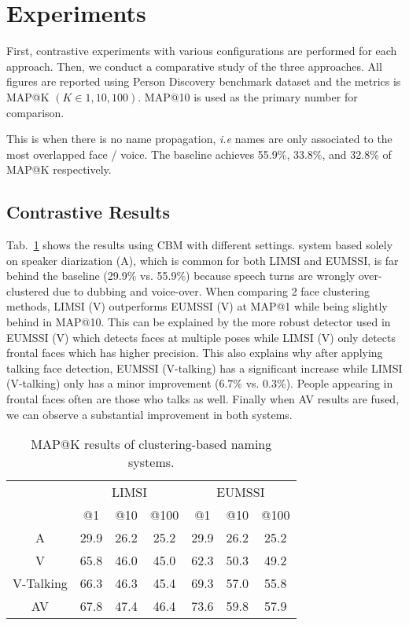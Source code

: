 \section{Experiments}
\label{sec:experiment}

First, contrastive experiments with various configurations are performed for each approach. Then, we conduct a comparative study of the three approaches. All figures are reported using Person Discovery benchmark dataset and the metrics is MAP@K $(K \in {1, 10, 100})$. MAP@10 is used as the primary number for comparison.

 This is when there is no name propagation, \emph{i.e} names are only associated to the most overlapped face / voice. The baseline achieves 55.9\%, 33.8\%, and 32.8\% of MAP@K respectively.

\subsection{Contrastive Results}

 Tab.~\ref{tab:clustering} shows the results using CBM with different settings. system based solely on speaker diarization (A), which is common for both LIMSI and EUMSSI, is far behind the baseline (29.9\% vs. 55.9\%) because speech turns are wrongly over-clustered due to dubbing and voice-over.
%
When comparing 2 face clustering methods, LIMSI (V) outperforms EUMSSI (V) at MAP@1 while being slightly behind in MAP@10. This can be explained by the more robust detector used in EUMSSI (V) which detects faces at multiple poses while LIMSI (V) only detects frontal faces which has higher precision.
%
This also explains why after applying talking face detection, EUMSSI (V-talking) has a significant increase while LIMSI (V-talking) only has a minor improvement (6.7\% vs. 0.3\%). People appearing in frontal faces often are those who talks as well.
%
Finally when AV results are fused, we can observe a substantial improvement in both systems.

\begin{table}[tb]
\centering
\caption{MAP@K results of clustering-based naming systems.}
\vspace*{-2mm}
\begin{tabular}{c|c|c|c|| c|c|c|}
\cline{2-7}
  &  \multicolumn{3}{|c||}{LIMSI} &  \multicolumn{3}{|c|}{EUMSSI} \\ \cline{2-7}
           & @1& @10& @100   & @1& @10& @100 \\ \hline
 \multicolumn{1}{|c|}{A} & 29.9   & 26.2   & 25.2  & 29.9   & 26.2   & 25.2\\ \hline
 \multicolumn{1}{|c|}{V} & 65.8   & 46.0   & 45.0 & 62.3   & 50.3   & 49.2 \\ \hline
 \multicolumn{1}{|c|}{V-Talking} & 66.3   & 46.3   & 45.4 & 69.3   & 57.0   & 55.8 \\ \hline
 \multicolumn{1}{|c|}{AV} & 67.8   & 47.4   & 46.4 & 73.6   & 59.8   & 57.9\\ \hline
\end{tabular}
%
\vspace*{-5mm}
\label{tab:clustering}
\end{table}


